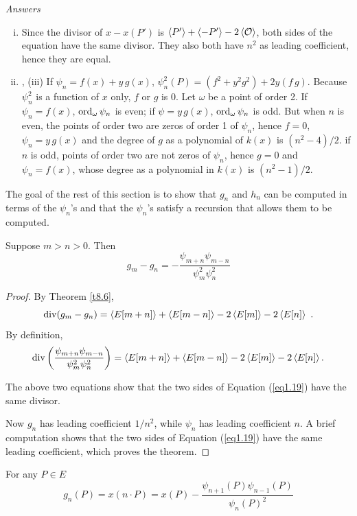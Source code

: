 {\it Answers}
\begin{enumerate}[(i)]
\item
Since the divisor of $x - x(P')$ is $\left\langle P' \right \rangle + \left\langle -P' \right \rangle - 2\left\langle \mathcal{O} \right \rangle$, both sides of the equation have the same divisor. They also both have $n^2$ as leading coefficient, hence they are equal.
\item, (iii)
If $\psi_n=f(x)+y \, g(x)$, $\psi_n^2(P) = (f^2+ y^2 g^2) + 2y (f \, g)$. Because $\psi_n^2$ is a function of $x$ only, $f$ or $g$ is 0. Let $\omega$ be a point of order 2. If $\psi_n=f(x)$,  $\operatorname{ord}_{\omega}\psi_n$ is even; if $\psi=y \, g(x)$,  $\operatorname{ord}_{\omega}\psi_n$ is odd. But when $n$ is even, the points of order two are zeros of order 1 of $\psi_n$, hence $f=0$, $\psi_n = y \, g(x)$ and the degree of $g$ as a polynomial of $k(x)$ is $(n^2 - 4)/2$. if $n$ is odd, points of order two are not zeros of $\psi_n$, hence $g=0$ and $\psi_n = f(x)$, whose degree as a polynomial in $k(x)$ is $(n^2-1)/2$.
\end{enumerate}

The goal of the rest of this section is to show that $g_{n}$ and $h_{n}$ can be computed in terms of the $\psi_{n}$'s and that the $\psi_{n}$'s satisfy a recursion that allows them to be computed.

\begin{theo}
\label{t9.3}
Suppose $m>n>0$. Then
\begin{equation}
\label{eq1.19}
g_{m}-g_{n}=-\displaystyle \frac{\psi_{m+n}\psi_{m-n}}{\psi_{m}^{2}\psi_{n}^{2}}
\end{equation}
\end{theo}

\begin{proof}
By Theorem \ref{t8.6},
$$
\on{div}(g_{m}-g_{n})=\divisor{E[m+n]}+\divisor{E[m-n]}-2\divisor{E[m]}-2\divisor{E[n]}\ .
$$
By definition,
\[\operatorname{div}\left(\frac{\psi_{m+n}\psi_{m-n}}{\psi_{m}^{2}\psi_{n}^{2}}\right)=\left\langle E[m+n] \right \rangle+\left\langle E[m-n] \right \rangle-2\left\langle E[m] \right \rangle-2\left\langle E[n] \right \rangle .\]

The above two equations show that the two sides of Equation (\ref{eq1.19}) have the same divisor.

Now $g_{n}$ has leading coefficient $1/n^{2}$, while $\psi_{n}$ has leading coefficient $n$. A brief computation shows that the two sides of Equation (\ref{eq1.19}) have the same leading coefficient, which proves the theorem.
\end{proof}

\begin{coro}
\label{c9.4}
For any $P\in E$
\begin{equation}
\label{eq1.20}
g_{n}(P)=x(n\displaystyle \cdot P)=x(P)-\frac{\psi_{n+1}(P)\psi_{n-1}(P)}{\psi_{n}(P)^{2}}
\end{equation}
\end{coro}

